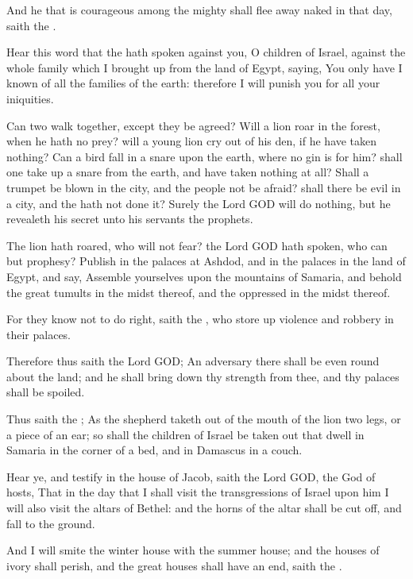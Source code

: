 \Verse And he that is courageous among the mighty shall flee away naked in that day, saith the \LORD.


\Chapter
\Verse Hear this word that the \LORD hath spoken against you, O children of Israel, against the whole family which I brought up from the land of Egypt, saying, \Verse You only have I known of all the families of the earth: therefore I will punish you for all your iniquities.

\Verse Can two walk together, except they be agreed?  \Verse Will a lion roar in the forest, when he hath no prey? will a young lion cry out of his den, if he have taken nothing?  \Verse Can a bird fall in a snare upon the earth, where no gin is for him?  shall one take up a snare from the earth, and have taken nothing at all?  \Verse Shall a trumpet be blown in the city, and the people not be afraid?  shall there be evil in a city, and the \LORD hath not done it?  \Verse Surely the Lord GOD will do nothing, but he revealeth his secret unto his servants the prophets.

\Verse The lion hath roared, who will not fear? the Lord GOD hath spoken, who can but prophesy?  \Verse Publish in the palaces at Ashdod, and in the palaces in the land of Egypt, and say, Assemble yourselves upon the mountains of Samaria, and behold the great tumults in the midst thereof, and the oppressed in the midst thereof.

\Verse For they know not to do right, saith the \LORD, who store up violence and robbery in their palaces.

\Verse Therefore thus saith the Lord GOD; An adversary there shall be even round about the land; and he shall bring down thy strength from thee, and thy palaces shall be spoiled.

\Verse Thus saith the \LORD; As the shepherd taketh out of the mouth of the lion two legs, or a piece of an ear; so shall the children of Israel be taken out that dwell in Samaria in the corner of a bed, and in Damascus in a couch.

\Verse Hear ye, and testify in the house of Jacob, saith the Lord GOD, the God of hosts, \Verse That in the day that I shall visit the transgressions of Israel upon him I will also visit the altars of Bethel: and the horns of the altar shall be cut off, and fall to the ground.

\Verse And I will smite the winter house with the summer house; and the houses of ivory shall perish, and the great houses shall have an end, saith the \LORD.


